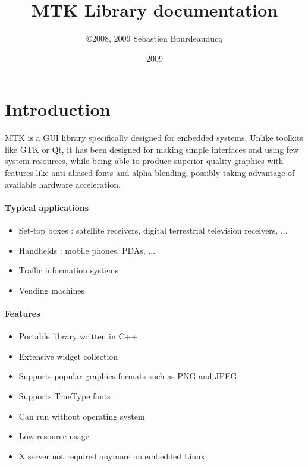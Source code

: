 \documentclass[a4paper,11pt]{journal}
\title{MTK Library documentation}
\author{\copyright 2008, 2009 S\'ebastien Bourdeauducq}
\date{2009}
\begin{document}
\maketitle{}

\section{Introduction}
MTK is a GUI library specifically designed for embedded systems. Unlike toolkits like GTK or Qt, it has been designed for making simple interfaces and using few system resources, while being able to produce superior quality graphics with features like anti-aliased fonts and alpha blending, possibly taking advantage of available hardware acceleration.

\paragraph{Typical applications}
\begin{itemize}[noitemsep,topsep=0mm]
\item Set-top boxes : satellite receivers, digital terrestrial television receivers, ...
\item Handhelds : mobile phones, PDAs, ...
\item Traffic information systems
\item Vending machines
\end{itemize}

\paragraph{Features}
\begin{itemize}[noitemsep,topsep=0mm]
\item Portable library written in C++
\item Extensive widget collection
\item Supports popular graphics formats such as PNG and JPEG
\item Supports TrueType fonts
\item Can run without operating system
\item Low resource usage
\item X server not required anymore on embedded Linux
\end{itemize}
\end{document}

